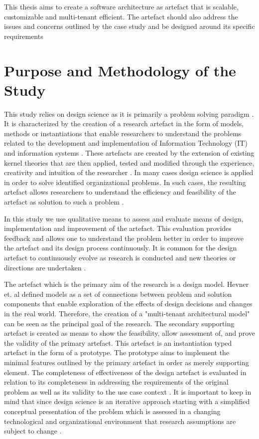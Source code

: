 \begin{fancyquotes}
This thesis aims to create a software architecture as artefact that is scalable, customizable and multi-tenant efficient. The artefact should also address the issues and concerns outlined by the case study and be designed around its specific requirements
\end{fancyquotes}

\section{Purpose and Methodology of the Study}

This study relies on design science as it is primarily a problem solving paradigm \cite{Hevner2004}. It is characterized by the creation of a research artefact in the form of models, methods or instantiations that enable researchers to understand the problems related to the development and implementation of Information Technology (IT) and information systems \cite{March1995a}. These artefacts are created by the extension of existing kernel theories that are then applied, tested and modified through the experience, creativity and intuition of the researcher \cite{Walls1992}. In many cases design science is applied in order to solve identified organizational problems. In such cases, the resulting artefact allows researchers to understand the efficiency and feasibility of the artefact as solution to such a problem \cite{Hevner2004}.
 
In this study we use qualitative means to assess and evaluate means of design, implementation and improvement of the artefact. This evaluation provides feedback and allows one to understand the problem better in order to improve the artefact and its design process continuously. It is common for the design artefact to continuously evolve as research is conducted and new theories or directions are undertaken \cite{Hevner2004}.
 
The artefact which is the primary aim of the research is a design model. Hevner et. al \cite{Hevner2004} defined models as a set of connections between problem and solution components that enable exploration of the effects of design decisions and changes in the real world. Therefore, the creation of a "multi-tenant architectural model" can be seen as the principal goal of the research. The secondary supporting artefact is created as means to show the feasibility, allow assessment of, and prove the validity of the primary artefact. This artefact is an instantiation typed artefact \cite{Hevner2004} in the form of a prototype. The prototype aims to implement the minimal features outlined by the primary artefact in order as merely supporting element. The completeness of effectiveness of the design artefact is evaluated in relation to its completeness in addressing the requirements of the original problem as well as its validity to the use case context \cite{Hevner2004}. It is important to keep in mind that since design science is an iterative approach starting with a simplified conceptual presentation of the problem which is assessed in a changing technological and organizational environment that research assumptions are subject to change \cite{Johansson2000}.


